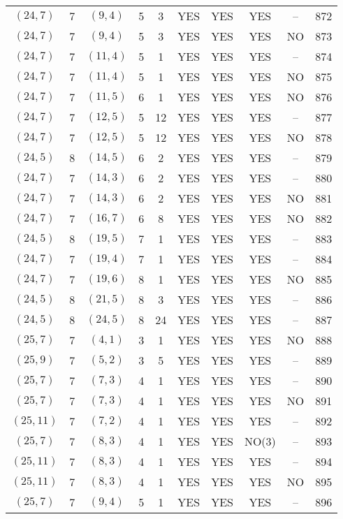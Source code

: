 \begin{longtable}{|c|c|c|c|c|c|c|c|c|c|}
$(24, 7)$ & 7 & $(9, 4)$ & 5 & 3 & YES & YES & YES & -- & 872\\
$(24, 7)$ & 7 & $(9, 4)$ & 5 & 3 & YES & YES & YES & NO & 873\\
$(24, 7)$ & 7 & $(11, 4)$ & 5 & 1 & YES & YES & YES & -- & 874\\
$(24, 7)$ & 7 & $(11, 4)$ & 5 & 1 & YES & YES & YES & NO & 875\\
$(24, 7)$ & 7 & $(11, 5)$ & 6 & 1 & YES & YES & YES & NO & 876\\
$(24, 7)$ & 7 & $(12, 5)$ & 5 & 12 & YES & YES & YES & -- & 877\\
$(24, 7)$ & 7 & $(12, 5)$ & 5 & 12 & YES & YES & YES & NO & 878\\
$(24, 5)$ & 8 & $(14, 5)$ & 6 & 2 & YES & YES & YES & -- & 879\\
$(24, 7)$ & 7 & $(14, 3)$ & 6 & 2 & YES & YES & YES & -- & 880\\
$(24, 7)$ & 7 & $(14, 3)$ & 6 & 2 & YES & YES & YES & NO & 881\\
$(24, 7)$ & 7 & $(16, 7)$ & 6 & 8 & YES & YES & YES & NO & 882\\
$(24, 5)$ & 8 & $(19, 5)$ & 7 & 1 & YES & YES & YES & -- & 883\\
$(24, 7)$ & 7 & $(19, 4)$ & 7 & 1 & YES & YES & YES & -- & 884\\
$(24, 7)$ & 7 & $(19, 6)$ & 8 & 1 & YES & YES & YES & NO & 885\\
$(24, 5)$ & 8 & $(21, 5)$ & 8 & 3 & YES & YES & YES & -- & 886\\
$(24, 5)$ & 8 & $(24, 5)$ & 8 & 24 & YES & YES & YES & -- & 887\\
$(25, 7)$ & 7 & $(4, 1)$ & 3 & 1 & YES & YES & YES & NO & 888\\
$(25, 9)$ & 7 & $(5, 2)$ & 3 & 5 & YES & YES & YES & -- & 889\\
$(25, 7)$ & 7 & $(7, 3)$ & 4 & 1 & YES & YES & YES & -- & 890\\
$(25, 7)$ & 7 & $(7, 3)$ & 4 & 1 & YES & YES & YES & NO & 891\\
$(25, 11)$ & 7 & $(7, 2)$ & 4 & 1 & YES & YES & YES & -- & 892\\
$(25, 7)$ & 7 & $(8, 3)$ & 4 & 1 & YES & YES & NO(3) & -- & 893\\
$(25, 11)$ & 7 & $(8, 3)$ & 4 & 1 & YES & YES & YES & -- & 894\\
$(25, 11)$ & 7 & $(8, 3)$ & 4 & 1 & YES & YES & YES & NO & 895\\
$(25, 7)$ & 7 & $(9, 4)$ & 5 & 1 & YES & YES & YES & -- & 896\\

\end{longtable}
